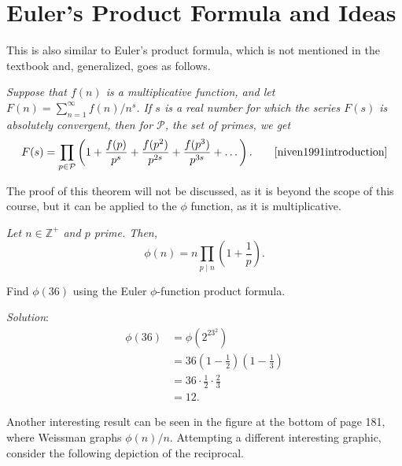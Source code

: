 \documentclass[12pt]{article}
\newenvironment{problem}[2][Problem]{\begin{trivlist}
\item[\hskip \labelsep {\bfseries #1}\hskip \labelsep {\bfseries #2}]}{\end{trivlist}}
\newenvironment{theorem}[2][Theorem]{\begin{trivlist}
\item[\hskip \labelsep {\bfseries #1}\hskip \labelsep {\bfseries #2}]}{\end{trivlist}}
\newenvironment{corollary}[2][Corollary]{\begin{trivlist}
\item[\hskip \labelsep {\bfseries #1}\hskip \labelsep {\bfseries #2}]}{\end{trivlist}}
\begin{document}
\section{Euler's Product Formula and Ideas}

\hspace{1em} This is also similar to Euler's product formula, which is not mentioned in the textbook and, generalized, goes as follows.

\begin{theorem}{7.24 (Euler's general product formula)} \textit{Suppose that $f(n)$ is a multiplicative function, and let $F(n) = \sum_{n = 1}^\infty f(n)/n^s$. If $s$ is a real number for which the series $F(s)$ is absolutely convergent, then for $\mathcal{P}$, the set of primes, we get} \begin{align*}
    F(s) = \prod_{p \in \mathcal{P}} \left( 1 + \frac{f(p)}{p^s} + \frac{f(p^2)}{p^{2s}} + \frac{f(p^3)}{p^{3s}} + \dots \right). \tag*{\cite[pg.381]{niven1991introduction}}
\end{align*}
\end{theorem}

\vspace{1em} The proof of this theorem will not be discussed, as it is beyond the scope of this course, but it can be applied to the $\phi$ function, as it is multiplicative.

\vspace{1em}

\begin{corollary}{7.25 (Euler's $\phi$-function product formula)}
\textit{Let $n \in \mathbb{Z}^+$ and $p$ prime. Then, } $$\phi(n) = n\prod_{p \mid n} \left( 1 + \frac{1}{p} \right).$$
\end{corollary}

\begin{problem}{7.26} Find $\phi(36)$ using the Euler $\phi$-function product formula.

\textit{Solution}: \begin{align*}
    \phi(36) &= \phi(2^23^2) \\ &= 36(1 - \frac{1}{2})(1 - \frac{1}{3}) \\ &= 36 \cdot \frac{1}{2} \cdot \frac{2}{3} \\ &= 12.
\end{align*}
\end{problem}

Another interesting result can be seen in the figure at the bottom of page 181, where Weissman graphs $\phi(n)/n$. \cite[pg.181]{weissman_2017} Attempting a different interesting graphic, consider the following depiction of the reciprocal.
\end{document}
